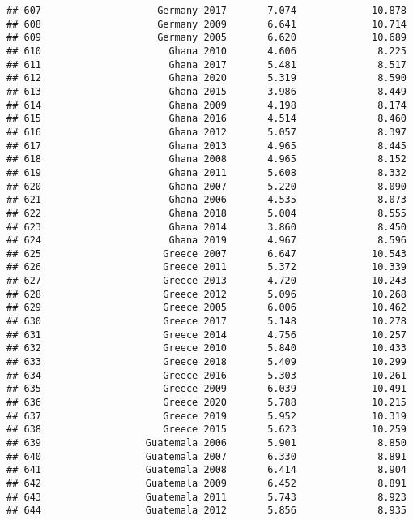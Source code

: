 \documentclass[
]{article}
\begin{document}
\begin{verbatim}
## 607                    Germany 2017       7.074             10.878
## 608                    Germany 2009       6.641             10.714
## 609                    Germany 2005       6.620             10.689
## 610                      Ghana 2010       4.606              8.225
## 611                      Ghana 2017       5.481              8.517
## 612                      Ghana 2020       5.319              8.590
## 613                      Ghana 2015       3.986              8.449
## 614                      Ghana 2009       4.198              8.174
## 615                      Ghana 2016       4.514              8.460
## 616                      Ghana 2012       5.057              8.397
## 617                      Ghana 2013       4.965              8.445
## 618                      Ghana 2008       4.965              8.152
## 619                      Ghana 2011       5.608              8.332
## 620                      Ghana 2007       5.220              8.090
## 621                      Ghana 2006       4.535              8.073
## 622                      Ghana 2018       5.004              8.555
## 623                      Ghana 2014       3.860              8.450
## 624                      Ghana 2019       4.967              8.596
## 625                     Greece 2007       6.647             10.543
## 626                     Greece 2011       5.372             10.339
## 627                     Greece 2013       4.720             10.243
## 628                     Greece 2012       5.096             10.268
## 629                     Greece 2005       6.006             10.462
## 630                     Greece 2017       5.148             10.278
## 631                     Greece 2014       4.756             10.257
## 632                     Greece 2010       5.840             10.433
## 633                     Greece 2018       5.409             10.299
## 634                     Greece 2016       5.303             10.261
## 635                     Greece 2009       6.039             10.491
## 636                     Greece 2020       5.788             10.215
## 637                     Greece 2019       5.952             10.319
## 638                     Greece 2015       5.623             10.259
## 639                  Guatemala 2006       5.901              8.850
## 640                  Guatemala 2007       6.330              8.891
## 641                  Guatemala 2008       6.414              8.904
## 642                  Guatemala 2009       6.452              8.891
## 643                  Guatemala 2011       5.743              8.923
## 644                  Guatemala 2012       5.856              8.935

\end{verbatim}
\end{document}
